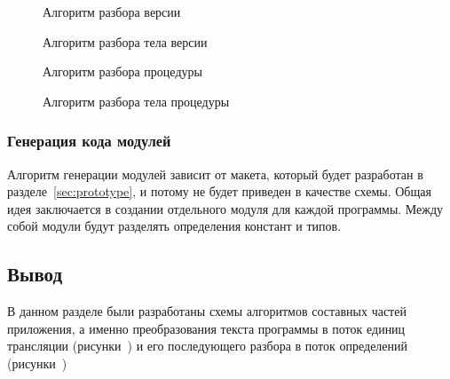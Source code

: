 \clearpage

\vspace*{\fill}
\begin{figure}[!h]
    \centering
    \def\svgwidth{\textwidth}
    
    \caption{Алгоритм разбора версии}
    \label{fig:parser_version_alg}
\end{figure}
\vfill
\begin{figure}[!h]
    \centering
    \def\svgwidth{0.4\textwidth}
    
    \caption{Алгоритм разбора тела версии}
    \label{fig:parser_version_body_alg}
\end{figure}
\vfill

\clearpage

\vspace*{\fill}
\begin{figure}[!h]
    \centering
    \def\svgwidth{\textwidth}
    
    \caption{Алгоритм разбора процедуры}
    \label{fig:parser_procedure_alg}
\end{figure}
\vfill
\begin{figure}[!h]
    \centering
    \def\svgwidth{0.5\textwidth}
    
    \caption{Алгоритм разбора тела процедуры}
    \label{fig:parser_procedure_args_alg}
\end{figure}
\vfill

\clearpage

\subsubsection{Генерация кода модулей}

Алгоритм генерации модулей зависит от макета, который будет разработан в
разделе~\ref{sec:prototype}, и потому не будет приведен в качестве схемы. Общая
идея заключается в создании отдельного модуля для каждой программы. Между собой
модули будут разделять определения констант и типов.

\subsection*{Вывод}

В данном разделе были разработаны схемы алгоритмов составных частей приложения,
а именно преобразования текста программы в поток единиц трансляции
(рисунки~) и его последующего разбора
в поток определений
(рисунки~)

